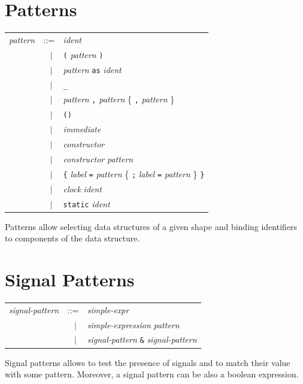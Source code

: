 \documentclass[11pt,titlepage,twoside]{report}
\newcommand{\alt}{\;|\;}
\newcommand{\term}[1]{{\tt #1}}
\newcommand{\nterm}[1]{{\em #1}}
\begin{document}
\section{Patterns}
\begin{center}
\begin{tabular}{lcl}
\nterm{pattern} & ::=        & \nterm{ident} \\
                & $\;\;\alt$ & \term{(} \nterm{pattern} \term{)} \\
                & $\;\;\alt$ & \nterm{pattern} \term{as} \nterm{ident} \\
                & $\;\;\alt$ & \term{\_} \\
                & $\;\;\alt$ & \nterm{pattern} \term{,} \nterm{pattern} 
                               \{ \term{,} \nterm{pattern} \} \\
                & $\;\;\alt$ & \term{()} \\
                & $\;\;\alt$ & \nterm{immediate} \\
                & $\;\;\alt$ & \nterm{constructor} \\
                & $\;\;\alt$ & \nterm{constructor} \nterm{pattern} \\
                & $\;\;\alt$ & \term{\{} \nterm{label} 
                               \term{=} \nterm{pattern} \{ \term{;} 
                               \nterm{label} \term{=} \nterm{pattern}
                               \} \term{\}} \\
                & $\;\;\alt$ & \nterm{clock} \nterm{ident} \\
                & $\;\;\alt$ & \term{static} \nterm{ident}
\end{tabular}
\end{center}
Patterns allow selecting data structures of a given shape and binding
identifiers to components of the data structure.

\section{Signal Patterns}
\begin{center}
\begin{tabular}{lcl}
\nterm{signal-pattern} 
   & ::=        & \nterm{simple-expr} \\
   & $\;\;\alt$ & \nterm{simple-expression} \nterm{pattern} \\ 
   & $\;\;\alt$ & \nterm{signal-pattern} \term{\&} \nterm{signal-pattern}
\end{tabular}
\end{center}
Signal patterns allows to test the presence of signals and to match
their value with some pattern. Moreover, a signal pattern can be also
a boolean expression.
\end{document}
